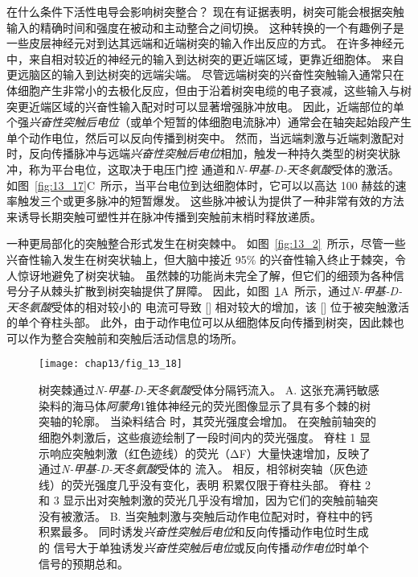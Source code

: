 在什么条件下活性电导会影响树突整合？
现在有证据表明，树突可能会根据突触输入的精确时间和强度在被动和主动整合之间切换。
这种转换的一个有趣例子是一些皮层神经元对到达其远端和近端树突的输入作出反应的方式。
在许多神经元中，来自相对较近的神经元的输入到达树突的更近端区域，更靠近细胞体。
来自更远脑区的输入到达树突的远端尖端。
尽管远端树突的兴奋性突触输入通常只在体细胞产生非常小的去极化反应，但由于沿着树突电缆的电子衰减，这些输入与树突更近端区域的兴奋性输入配对时可以显著增强脉冲放电。
因此，近端部位的单个强\textit{兴奋性突触后电位}（或单个短暂的体细胞电流脉冲）通常会在轴突起始段产生单个动作电位，然后可以反向传播到树突中。
然而，当远端刺激与近端刺激配对时，反向传播脉冲与远端\textit{兴奋性突触后电位}相加，触发一种持久类型的树突状脉冲，称为平台电位，这取决于电压门控  通道和\textit{N-甲基-D-天冬氨酸}受体的激活。
如图~\ref{fig:13_17}C~所示，当平台电位到达细胞体时，它可以以高达 100 赫兹的速率触发三个或更多脉冲的短暂爆发。
这些脉冲被认为提供了一种非常有效的方法来诱导长期突触可塑性并在脉冲传播到突触前末梢时释放递质。


一种更局部化的突触整合形式发生在树突棘中。
如图~\ref{fig:13_2}~所示，尽管一些兴奋性输入发生在树突状轴上，但大脑中接近 95\% 的兴奋性输入终止于棘突，令人惊讶地避免了树突状轴。
虽然棘的功能尚未完全了解，但它们的细颈为各种信号分子从棘头扩散到树突轴提供了屏障。
因此，如图~\ref{fig:13_18}A~所示，通过\textit{N-甲基-D-天冬氨酸}受体的相对较小的  电流可导致 [] 相对较大的增加，该 [] 位于被突触激活的单个脊柱头部。
此外，由于动作电位可以从细胞体反向传播到树突，因此棘也可以作为整合突触前和突触后活动信息的场所。


\begin{figure}[htbp]
	\centering
	\texttt{[image: chap13/fig\_13\_18]}
	\caption{树突棘通过\textit{N-甲基-D-天冬氨酸}受体分隔钙流入。
		A. 这张充满钙敏感染料的海马体\textit{阿蒙角}1锥体神经元的荧光图像显示了具有多个棘的树突轴的轮廓。
		当染料结合  时，其荧光强度会增加。
		在突触前轴突的细胞外刺激后，这些痕迹绘制了一段时间内的荧光强度。
		脊柱 1 显示响应突触刺激（红色迹线）的荧光（ΔF）大量快速增加，反映了通过\textit{N-甲基-D-天冬氨酸}受体的  流入。
		相反，相邻树突轴（灰色迹线）的荧光强度几乎没有变化，表明  积累仅限于脊柱头部。
		脊柱 2 和 3 显示出对突触刺激的荧光几乎没有增加，因为它们的突触前轴突没有被激活\cite{lang2004transient}。 
		B. 当突触刺激与突触后动作电位配对时，脊柱中的钙积累最多。
		同时诱发\textit{兴奋性突触后电位}和反向传播动作电位时生成的  信号大于单独诱发\textit{兴奋性突触后电位}或反向传播\textit{动作电位}时单个  信号的预期总和\cite{yuste1995dendritic}。}
	\label{fig:13_18}
\end{figure}


